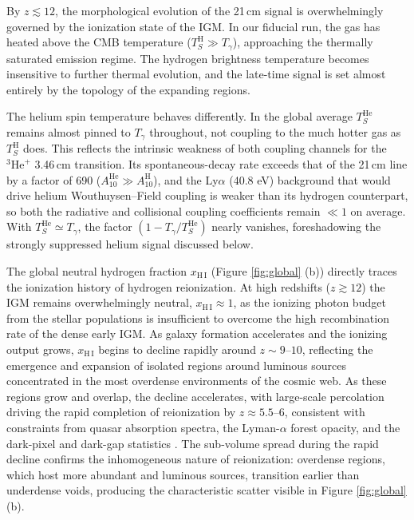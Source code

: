 \documentclass[apj,twocolumn, appendixfloats, twocolappendix, numberedappendix, tighten]{openjournal}
\begin{document}
By $z \lesssim 12$, the morphological evolution of the 21\,cm signal is overwhelmingly governed by the ionization state of the IGM. In our fiducial run, the gas has heated above the CMB temperature ($T_S^\mathrm{H} \gg T_\gamma$), approaching the thermally saturated emission regime. The hydrogen brightness temperature becomes insensitive to further thermal evolution, and the late-time signal is set almost entirely by the topology of the expanding  regions.



The helium spin temperature behaves differently. In the global average $T_S^\mathrm{He}$ remains almost pinned to $T_\gamma$ throughout, not coupling to the much hotter gas as $T_S^\mathrm{H}$ does. This reflects the intrinsic weakness of both coupling channels for the $^{3}\mathrm{He}^{+}$ 3.46\,cm transition. Its spontaneous-decay rate exceeds that of the 21\,cm line by a factor of 690 ($A^\mathrm{He}_{10} \gg A^\mathrm{H}_{10}$), and the  Ly$\alpha$ (40.8 eV) background that would drive helium Wouthuysen--Field coupling is weaker than its hydrogen counterpart, so both the radiative and collisional coupling coefficients remain $\ll 1$ on average. With $T_S^\mathrm{He} \simeq T_\gamma$, the factor $(1 - T_\gamma/T_S^\mathrm{He})$ nearly vanishes, foreshadowing the strongly suppressed helium signal discussed below.



The global neutral hydrogen fraction $x_\mathrm{H\,I}$ (Figure \ref{fig:global} (b)) directly traces the ionization history of hydrogen reionization. At high redshifts ($z \gtrsim 12$) the IGM remains overwhelmingly neutral, $x_\mathrm{H\,I} \approx 1$, as the ionizing photon budget from the stellar populations is insufficient to overcome the high recombination rate of the dense early IGM. As galaxy formation accelerates and the ionizing output grows, $x_\mathrm{H\,I}$ begins to decline rapidly around $z \sim 9$--$10$, reflecting the emergence and expansion of isolated  regions around luminous sources concentrated in the most overdense environments of the cosmic web. As these regions grow and overlap, the decline accelerates, with large-scale percolation driving the rapid completion of reionization by $z \approx 5.5$--$6$, consistent with constraints from quasar absorption spectra, the Lyman-$\alpha$ forest opacity, and the dark-pixel and dark-gap statistics \citep[e.g.][]{McGreer2015, Bosman2022, Zhu2022}. The sub-volume spread during the rapid decline confirms the inhomogeneous nature of reionization: overdense regions, which host more abundant and luminous sources, transition earlier than underdense voids, producing the characteristic scatter visible in Figure \ref{fig:global} (b).
\end{document}
